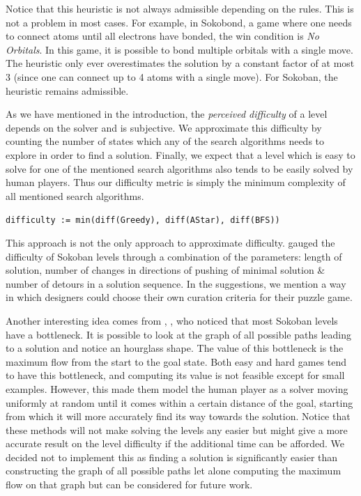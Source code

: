 Notice that this heuristic is not always admissible depending on the rules. This is not a problem in most cases. For example, in Sokobond, a game where one needs to connect atoms until all electrons have bonded, the win condition is \textit{No Orbitals}. In this game, it is possible to bond multiple orbitals with a single move. The heuristic only ever overestimates the solution by a constant factor of at most 3 (since one can connect up to 4 atoms with a single move). For Sokoban, the heuristic remains admissible.

As we have mentioned in the introduction, the \textit{perceived difficulty} of a level depends on the solver and is subjective. We approximate this difficulty by counting the number of states which any of the search algorithms needs to explore in order to find a solution. 
Finally, we expect that a level which is easy to solve for one of the mentioned search algorithms also tends to be easily solved by human players.
Thus our difficulty metric is simply the minimum complexity of all mentioned search algorithms.

\lstinline{difficulty := min(diff(Greedy), diff(AStar), diff(BFS))}


This approach is not the only approach to approximate difficulty. \cite{Science1996} gauged the difficulty of Sokoban levels through a combination of the parameters: length of solution, number of changes in directions of pushing of minimal solution \& number of detours in a solution sequence. In the suggestions, we mention a way in which designers could choose their own curation criteria for their puzzle game.


Another interesting idea comes from \cite{Pelanek2011}, \cite{Jaru}, who noticed that most Sokoban levels have a bottleneck. It is possible to look at the graph of all possible paths leading to a solution and notice an hourglass shape. The value of this bottleneck is the maximum flow from the start to the goal state. Both easy and hard games tend to have this bottleneck, and computing its value is not feasible except for small examples. However, this made them model the human player as a solver moving uniformly at random until it comes within a certain distance of the goal, starting from which it will more accurately find its way towards the solution. Notice that these methods will not make solving the levels any easier but might give a more accurate result on the level difficulty if the additional time can be afforded. We decided not to implement this as finding a solution is significantly easier than constructing the graph of all possible paths let alone computing the maximum flow on that graph but can be considered for future work.
 
